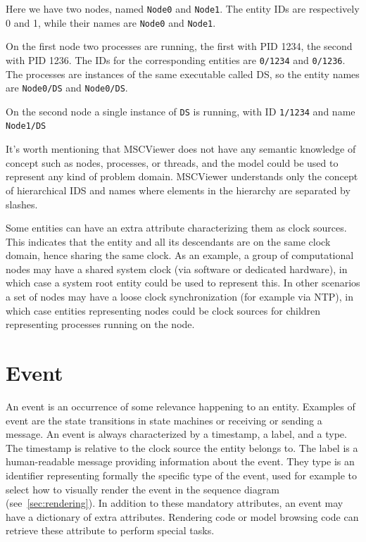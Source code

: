 \documentclass[11pt, twoside, titlepage]{book}
\newcommand{\prog}{MSCViewer}
\begin{document}
Here we have two nodes, named \texttt{Node0} and \texttt{Node1}. The entity IDs
are respectively 0 and 1, while their names are \texttt{Node0} and
\texttt{Node1}. 

On the first node two processes are running, the first with PID
1234, the second with PID 1236. The IDs for the corresponding entities are
\texttt{0/1234} and \texttt{0/1236}. The processes are instances of the same
executable called DS, so the entity names are \texttt{Node0/DS} and
\texttt{Node0/DS}. 

On the second node a single instance of \texttt{DS} is running, with ID
\texttt{1/1234} and name \texttt{Node1/DS}

It's worth mentioning that \prog{} does not have any semantic knowledge of
concept such as nodes, processes, or threads, and the model could be used to
represent any kind of problem domain. \prog{} understands only the concept of
hierarchical IDS and names where elements in the hierarchy are separated by
slashes.

Some entities can have an extra attribute characterizing them as clock sources.
This indicates that the entity and all its descendants are on
the same clock domain, hence sharing the same clock. As an example, a group of
computational nodes may have a shared system clock (via software or dedicated
hardware), in which case a system root entity could be used to represent this.
In other scenarios a set of nodes may have a loose clock synchronization (for
example via NTP), in which case entities representing nodes could be clock
sources for children representing processes running on the node.


\section {Event} 
An event is an occurrence of some relevance happening to an entity. Examples of
event are the state transitions in state machines or receiving or sending a
message. An event is always characterized by a timestamp, a label, and a type.
The timestamp is relative to the clock source the entity belongs to. The label is a
human-readable message providing information about the event. They type is an
identifier representing formally the specific type of the event, used for
example to select how to visually render the event in the sequence diagram 
(see~\ref{sec:rendering}). In addition to these mandatory attributes, an event
may have a dictionary of extra attributes. Rendering code or model browsing code can retrieve these
attribute to perform special tasks.
\end{document}
